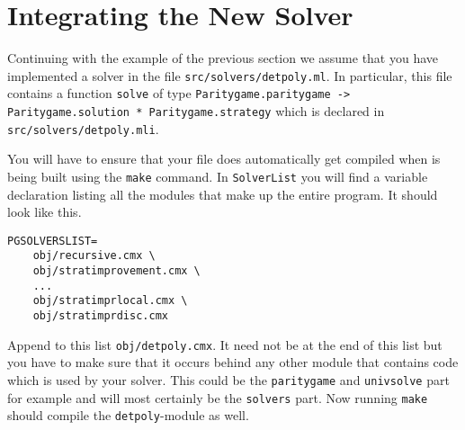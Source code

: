 \section{Integrating the New Solver}

Continuing with the example of the previous section we assume that you have implemented a solver in the file
\texttt{src/solvers/detpoly.ml}. In particular, this file contains a function \texttt{solve} of type
\texttt{Paritygame.paritygame -> Paritygame.solution * Paritygame.strategy} which is declared in
\texttt{src/solvers/detpoly.mli}.

You will have to ensure that your file does automatically get compiled when \pgsolver is being built using
the \texttt{make} command. In \texttt{SolverList} you will find a variable declaration listing all the modules
that make up the entire program. It should look like this.
\begin{verbatim}
PGSOLVERSLIST=
	obj/recursive.cmx \
	obj/stratimprovement.cmx \
	...
	obj/stratimprlocal.cmx \
	obj/stratimprdisc.cmx 
\end{verbatim}
Append to this list \texttt{obj/detpoly.cmx}. It need not be at the end of this list but you have to make
sure that it occurs behind any other module that contains code which is used by your solver. This could
be the \texttt{paritygame} and \texttt{univsolve} part for example and will most certainly be the
\texttt{solvers} part. Now running \texttt{make} should compile the \texttt{detpoly}-module as well.


